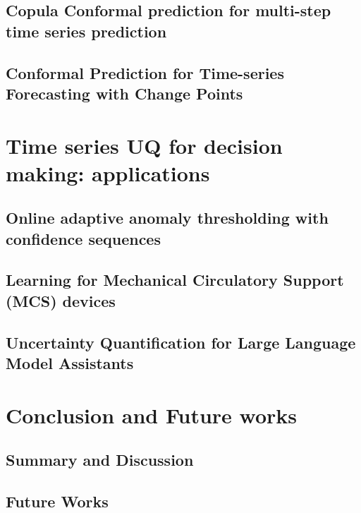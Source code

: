 \documentclass[12pt]{ucsddissertation}
\begin{document}
\chapter{Copula Conformal prediction for multi-step time series prediction}


\chapter{Conformal Prediction for Time-series Forecasting with Change Points}



\part{Time series UQ for decision making: applications}
\chapter{Online adaptive anomaly thresholding with confidence sequences}


\chapter{Learning for Mechanical Circulatory Support (MCS) devices}


\chapter{Uncertainty Quantification for Large Language Model Assistants}




\part{Conclusion and Future works}
\chapter{Summary and Discussion}
\chapter{Future Works}

\appendix

\backmatter

\end{document}
